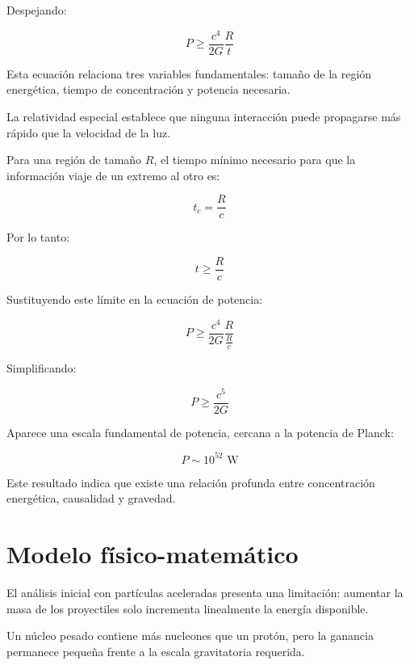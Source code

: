 \documentclass[a4paper,10pt,twocolumn]{article}
\begin{document}
Despejando:

\begin{equation}
\boxed{P\geq\frac{c^4}{2G}\frac{R}{t}}
\end{equation}

Esta ecuación relaciona tres variables fundamentales: tamaño de la región energética, tiempo de concentración y potencia necesaria.

La relatividad especial establece que ninguna interacción puede propagarse más rápido que la velocidad de la luz.

Para una región de tamaño $R$, el tiempo mínimo necesario para que la información viaje de un extremo al otro es:

\begin{equation}
t_c=\frac{R}{c}
\end{equation}

Por lo tanto:

\begin{equation}
t\geq\frac{R}{c}
\end{equation}

Sustituyendo este límite en la ecuación de potencia:

\begin{equation}
P\geq\frac{c^4}{2G}\frac{R}{\frac{R}{c}}
\end{equation}

Simplificando:

\begin{equation}
\boxed{P\geq\frac{c^5}{2G}}
\end{equation}

Aparece una escala fundamental de potencia, cercana a la potencia de Planck:

\begin{equation}
P\sim10^{52}\text{ W}
\end{equation}

Este resultado indica que existe una relación profunda entre concentración energética, causalidad y gravedad.

\section{Modelo físico-matemático}
El análisis inicial con partículas aceleradas presenta una limitación: aumentar la masa de los proyectiles solo incrementa linealmente la energía disponible.

Un núcleo pesado contiene más nucleones que un protón, pero la ganancia permanece pequeña frente a la escala gravitatoria requerida.
\end{document}
